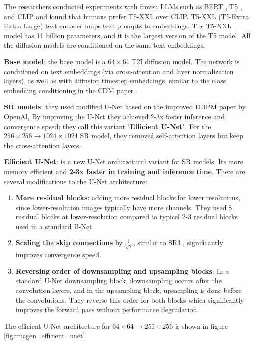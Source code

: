 The researchers conducted experiments with frozen LLMs such as BERT \cite{bert}, T5 \cite{t5_model}, and CLIP \cite{openai_clip} and found that humans prefer T5-XXL over CLIP. T5-XXL (T5-Extra Extra Large) text encoder maps text prompts to embeddings. The T5-XXL model has 11 billion parameters, and it is the largest version of the T5 model. All the diffusion models are conditioned on the same text embeddings.

\textbf{Base model}: the base model is a $64\times 64$ T2I diffusion model. The network is conditioned on text embeddings (via cross-attention and layer normalization layers), as well as with diffusion timestep embeddings, similar to the class embedding conditioning in the CDM paper \cite{cascaded_diffusion_models}.

\textbf{SR models}: they used modified U-Net based on the improved DDPM paper \cite{openai_improved_ddpm} by OpenAI, By improving the U-Net they achieved 2-3x faster inference and convergence speed; they call this variant "\textbf{Efficient U-Net}". For the $256\times 256 \rightarrow 1024\times 1024$ SR model, they removed self-attention layers but keep the cross-attention layers.

\textbf{Efficient U-Net}: is a new U-Net architectural variant for SR models. Its more memory efficient and \textbf{2-3x faster in training and inference time}. There are several modifications to the U-Net architecture:

\begin{enumerate}
    \item \textbf{More residual blocks}: adding more residual blocks for lower resolutions, since lower-resolution images typically have more channels. They used 8 residual blocks at lower-resolution compared to typical 2-3 residual blocks used in a standard U-Net.
    \item \textbf{Scaling the skip connections} by $\frac{1}{\sqrt{2}}$, similar to SR3 \cite{sr3}, significantly improves convergence speed.
    \item \textbf{Reversing order of downsampling and upsampling blocks}: In a standard U-Net downsampling block, downsampling occurs after the convolution layers, and in the upsampling block, upsampling is done before the convolutions. They reverse this order for both blocks which significantly improves the forward pass without performance degradation.
\end{enumerate}

The efficient U-Net architecture for $64\times 64 \rightarrow 256\times 256$ is shown in figure \ref{fig:imagen_efficient_unet}.

